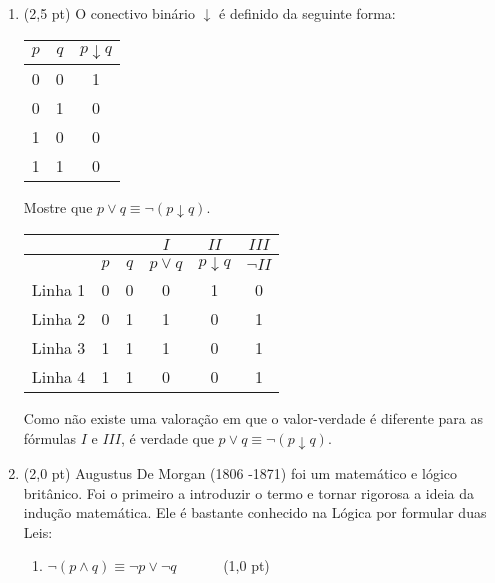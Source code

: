 \documentclass[11pt,a4paper,oneside]{article}
\begin{document}
\begin{enumerate}

	\item (2,5 pt) O conectivo binário $\downarrow$	é definido da seguinte forma:
		\begin{center}
			\begin{tabular}{c|c|c}
			\hline 
			$p$ & $q$ & $p \downarrow q$ \\ 
			\hline 
			0 & 0 & 1 \\ 
			0 & 1 & 0 \\ 
			1 & 0 & 0 \\ 
			1 & 1 & 0 \\ 
			\hline 
			\end{tabular} 
		\end{center}
		
		Mostre que $p \vee q \equiv \neg (p \downarrow q)$.\\
		
		{\color{verde} 
			\begin{center}
				\begin{tabular}{c|cc|c|c|c}
				 &  &  & $I$ & $II$ & $III$\\
				\hline
				 & $p$ & $q$ & $p \vee q$ & $p \downarrow q$ & $\neg II$ \\ 
				\hline 
				Linha 1 & 0 & 0 & 0 & 1 & 0 \\
				Linha 2 & 0 & 1 & 1 & 0 & 1 \\
				Linha 3 & 1 & 1 & 1 & 0 & 1 \\ 
				Linha 4 & 1 & 1 & 0 & 0 & 1 \\ 
				\hline 
				\end{tabular} 
			\end{center}
			
			Como não existe uma valoração em que o valor-verdade é diferente para as fórmulas $I$ e $III$, é verdade que $p \vee q \equiv \neg (p \downarrow q)$.
		}
		
	\item (2,0 pt) Augustus De Morgan (1806 -1871) foi um matemático e lógico britânico. Foi o primeiro a introduzir o termo e tornar rigorosa a ideia da indução matemática. Ele é bastante conhecido na Lógica por formular duas Leis: 

	\begin{enumerate}
		\item $\neg(p \wedge q) \equiv \neg p \vee \neg q$ \ \ \ \ \ \ (1,0 pt)\\
		

\end{enumerate}
\end{enumerate}
\end{document}
